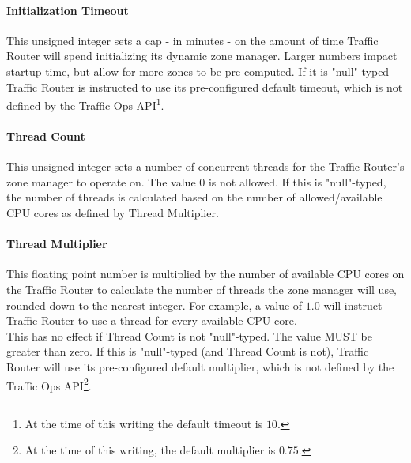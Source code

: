 \paragraph{Initialization Timeout}
This unsigned integer sets a cap - in minutes - on the amount of time Traffic
Router will spend initializing its dynamic zone manager. Larger numbers impact
startup time, but allow for more zones to be pre-computed. If it is "null"-typed
Traffic Router is instructed to use its pre-configured default timeout, which is
not defined by the Traffic Ops API\footnote{At the time of this writing the
default timeout is $10$.}.

\paragraph{Thread Count}
This unsigned integer sets a number of concurrent threads for the Traffic
Router's zone manager to operate on. The value 0 is not allowed. If this is
"null"-typed, the number of threads is calculated based on the number of
allowed/available CPU cores as defined by Thread Multiplier.

\paragraph{Thread Multiplier}
This floating point number is multiplied by the number of available CPU cores on
the Traffic Router to calculate the number of threads the zone manager will use,
rounded down to the nearest integer. For example, a value of $1.0$ will instruct
Traffic Router to use a thread for every available CPU core.\\
This has no effect if Thread Count is not "null"-typed. The value MUST be
greater than zero. If this is "null"-typed (and Thread Count is not), Traffic
Router will use its pre-configured default multiplier, which is not defined by
the Traffic Ops API\footnote{At the time of this writing, the default multiplier
is $0.75$.}.
